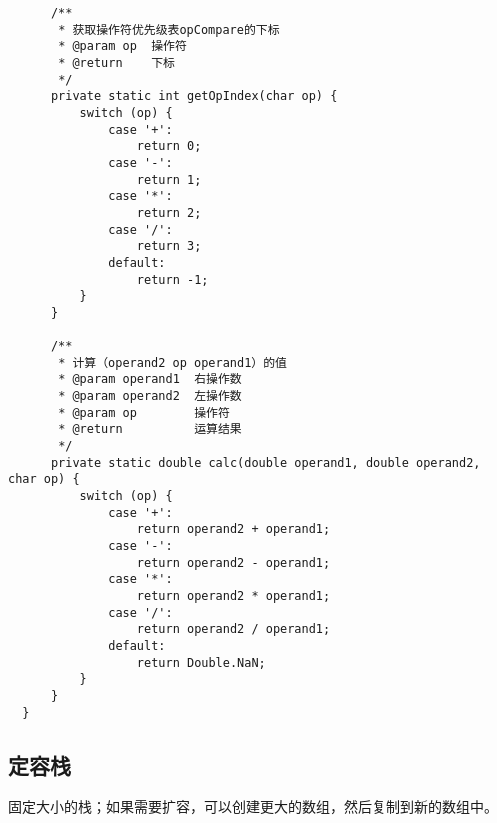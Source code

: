 \documentclass{article}
\begin{document}
\begin{verbatim}
      /**
       * 获取操作符优先级表opCompare的下标
       * @param op  操作符
       * @return    下标
       */
      private static int getOpIndex(char op) {
          switch (op) {
              case '+':
                  return 0;
              case '-':
                  return 1;
              case '*':
                  return 2;
              case '/':
                  return 3;
              default:
                  return -1;
          }
      }

      /**
       * 计算（operand2 op operand1）的值
       * @param operand1  右操作数
       * @param operand2  左操作数
       * @param op        操作符
       * @return          运算结果
       */
      private static double calc(double operand1, double operand2, char op) {
          switch (op) {
              case '+':
                  return operand2 + operand1;
              case '-':
                  return operand2 - operand1;
              case '*':
                  return operand2 * operand1;
              case '/':
                  return operand2 / operand1;
              default:
                  return Double.NaN;
          }
      }
  }
  \end{verbatim}

  \subsection{定容栈}
  固定大小的栈；如果需要扩容，可以创建更大的数组，然后复制到新的数组中。
\end{document}
